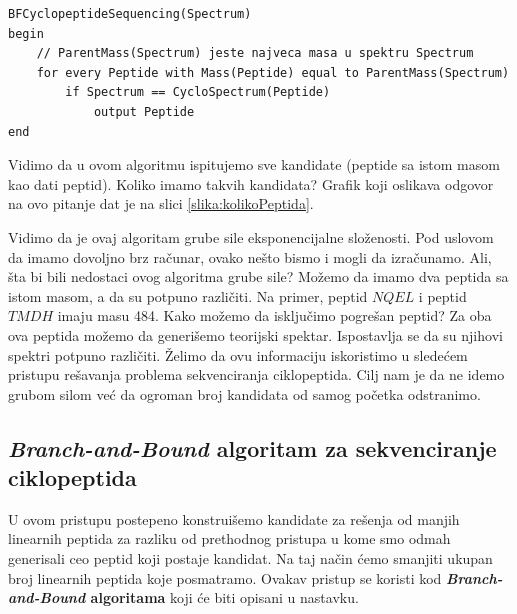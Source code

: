 \begin{lstlisting}
BFCyclopeptideSequencing(Spectrum)
begin
	// ParentMass(Spectrum) jeste najveca masa u spektru Spectrum
	for every Peptide with Mass(Peptide) equal to ParentMass(Spectrum)
		if Spectrum == CycloSpectrum(Peptide)
			output Peptide
end
\end{lstlisting}

Vidimo da u ovom algoritmu ispitujemo sve kandidate (peptide sa istom masom kao dati peptid). Koliko imamo takvih kandidata? Grafik koji oslikava odgovor na ovo pitanje dat je na slici \ref{slika:kolikoPeptida}.

Vidimo da je ovaj algoritam grube sile eksponencijalne složenosti. Pod uslovom da imamo dovoljno brz računar, ovako nešto bismo i mogli da izračunamo. Ali, šta bi bili nedostaci ovog algoritma grube sile? Možemo da imamo dva peptida sa istom masom, a da su potpuno različiti. Na primer, peptid $NQEL$ i peptid $TMDH$ imaju masu 484. Kako možemo da isključimo pogrešan peptid? Za oba ova peptida možemo da generišemo teorijski spektar. Ispostavlja se da su njihovi spektri potpuno različiti. Želimo da ovu informaciju iskoristimo u sledećem pristupu rešavanja problema sekvenciranja ciklopeptida. Cilj nam je da ne idemo grubom silom već da ogroman broj kandidata od samog početka odstranimo.
\newpage

\subsection{\textit{Branch-and-Bound} algoritam za sekvenciranje ciklopeptida}

U ovom pristupu postepeno konstruišemo kandidate za rešenja od manjih linearnih peptida za razliku od prethodnog pristupa u kome smo odmah generisali ceo peptid koji postaje kandidat. Na taj način ćemo smanjiti ukupan broj linearnih peptida koje posmatramo. Ovakav pristup se koristi kod \textbf{\textit{Branch-and-Bound} algoritama} koji će biti opisani u nastavku.

